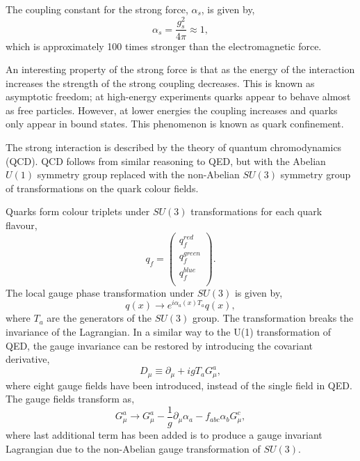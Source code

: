 The coupling constant for the strong force, $\alpha_s$, is given by,
\begin{equation}
\alpha_s = \frac{g_s^2}{4 \pi} \approx 1,
\end{equation}
which is approximately 100 times stronger than the {electromagnetic} force.

An interesting property of the strong force is that as the energy of the interaction
increases the strength of the strong coupling decreases. This is known as
asymptotic freedom; at high-energy experiments quarks appear to behave almost as
free particles. However, at lower energies the coupling increases and quarks
only appear in bound states. This phenomenon is known as quark confinement. 

The strong interaction is described by the theory of quantum chromodynamics
(QCD). QCD follows from similar reasoning to {QED}, but with
the Abelian $U(1)$ symmetry group replaced with the non-Abelian $SU(3)$ symmetry
group of transformations on the quark colour fields.

Quarks form colour triplets under $SU(3)$ transformations for each quark
flavour,
\begin{equation}
q_{f} =
\left(\begin{matrix} 
q^{red}_{f} \\
q^{green}_{f} \\
q^{blue}_{f} \\
\end{matrix} \right).
\end{equation}
The local gauge phase transformation under $SU(3)$ is given by,
\begin{equation}
q(x) \to e^{i\alpha_a(x)T_a} q(x),
\end{equation}
where $T_a$ are the generators of the $SU(3)$ group. The transformation breaks
the invariance of the Lagrangian. In a similar way to the U(1) transformation of
QED, the gauge invariance can be restored by introducing the covariant
derivative,
\begin{equation}
D_{\mu} \equiv \partial_{\mu} + i g T_{a} G_{\mu}^{a},
\end{equation}
where eight gauge fields have been introduced, instead of the single field in
QED.  The gauge fields transform as,
\begin{equation}
 G_{\mu}^{a} \to G_{\mu}^{a} 
-\frac{1}{g}\partial_{\mu}\alpha_{a}
-f_{abc}\alpha_{b}G^{c}_{\mu},
\end{equation}
where last additional term has been added is to produce a gauge invariant
Lagrangian due to the non-Abelian gauge transformation of $SU(3)$.

